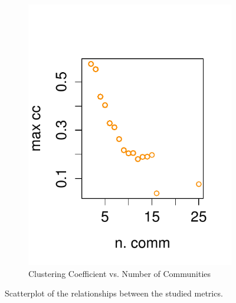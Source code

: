 \begin{figure}
\begin{subfigure}
                \caption{Average Bug Number vs. Number of Communities}
                \label{fig:abn-noc}
        \end{subfigure}%
        ~ %
        \begin{subfigure}%
        {0.3\textwidth}
                \includegraphics[width=\textwidth]{figure/EC_CC_power_law-eps-converted-to.pdf}
                \caption{Clustering Coefficient vs. Number of Communities}
                \label{fig:cc-noc}
        \end{subfigure}

        \caption{Scatterplot of the relationships between the studied metrics.}
        \label{fig:scatterplot-abn-cc-noc}
\end{figure}

